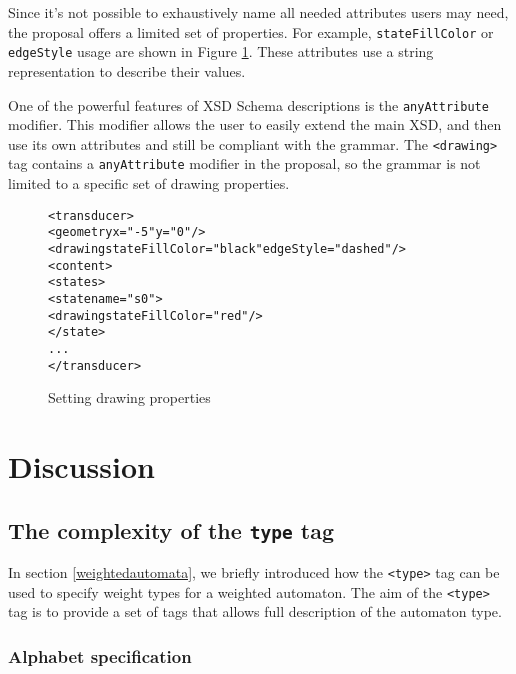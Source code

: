 \documentclass[a4paper]{llncs}
\begin{document}
Since it's not possible to exhaustively
name all needed attributes users may need, the proposal offers a
limited set of properties. For example, \verb|stateFillColor| or
\verb|edgeStyle| usage are shown in Figure \ref{drawing1}. These
attributes use a string representation to describe their values.

One of the powerful features of XSD Schema descriptions is the
\verb|anyAttribute| modifier. This modifier allows the user to easily
extend the main XSD, and then use its own attributes and still be
compliant with the grammar. The \verb|<drawing>| tag contains a
\verb|anyAttribute| modifier in the proposal, so the grammar is not
limited to a specific set of drawing properties.


{\small

\begin{figure}[h]
  \begin{center}
\begin{alltt}
<transducer>
  <geometry x="-5" y="0"/> 
  <drawing stateFillColor="black" edgeStyle="dashed"/>
  <content>
     <states>
        <state name="s0">
            <drawing stateFillColor="red"/>
        </state>
      ...
</transducer>
\end{alltt}

\caption{Setting drawing properties}
\label{drawing1}
  \end{center}
\end{figure}

}



\section{Discussion}

\subsection{The complexity of the {\tt type} tag}
\label{deepertypetag}

In section \ref{weightedautomata}, we briefly introduced how the
\verb|<type>| tag can be used to specify weight types for a weighted
automaton. The aim of the \verb|<type>| tag is to provide a set of
tags that allows full description of the automaton type.


\subsubsection{Alphabet specification}
\end{document}
